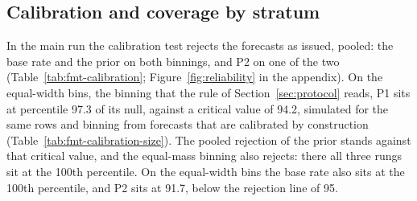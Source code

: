 \subsection{Calibration and coverage by stratum}
\label{sec:calibration-results}
In the main run the calibration test rejects the forecasts as issued, pooled: the base rate and the prior on both binnings, and P2 on one of the two (Table~\ref{tab:fmt-calibration}; Figure~\ref{fig:reliability} in the appendix). On the equal-width bins, the binning that the rule of Section~\ref{sec:protocol} reads, P1 sits at percentile 97.3 of its null, against a critical value of 94.2, simulated for the same rows and binning from forecasts that are calibrated by construction (Table~\ref{tab:fmt-calibration-size}). The pooled rejection of the prior stands against that critical value, and the equal-mass binning also rejects: there all three rungs sit at the 100th percentile. On the equal-width bins the base rate also sits at the 100th percentile, and P2 sits at 91.7, below the rejection line of 95.

\begin{table}[t]\centering\scriptsize
\caption{Calibration and pooled coverage of the ladder on the headline archive. The columns give expected calibration error (ECE) and its percentile under the null that draws the contrasts of a test together; the equal-mass ECE with its percentile; and the coverage of the 80 and 90 percent intervals. The latent correlation under the null is set to match the measured design effect, 1.49 for P1. The null draws 500 times, and a percentile above 95 counts as a rejection of calibration.}
\label{tab:fmt-calibration}

\end{table}

